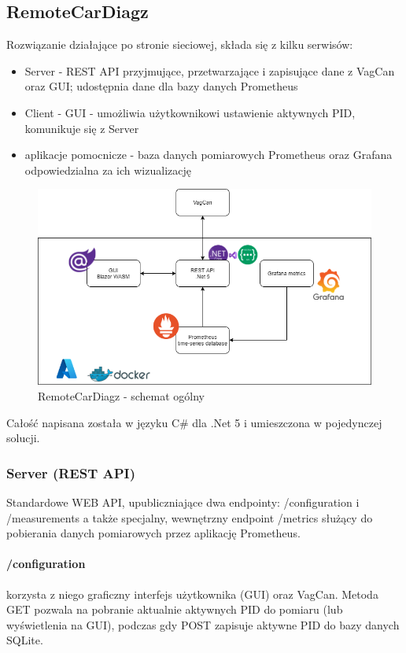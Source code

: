 \documentclass[10pt,a4paper]{article}
\begin{document}
		\subsection{RemoteCarDiagz}
		Rozwiązanie działające po stronie sieciowej, składa się z kilku serwisów:
		\begin{itemize}
			\item Server - REST API przyjmujące, przetwarzające i zapisujące dane z VagCan oraz GUI; udostępnia dane dla bazy danych Prometheus
			\item Client - GUI - umożliwia użytkownikowi ustawienie aktywnych PID, komunikuje się z Server
			\item aplikacje pomocnicze - baza danych pomiarowych Prometheus oraz Grafana odpowiedzialna za ich wizualizację
		\end{itemize}
		\begin{figure}[H]
			\centering
			\includegraphics[width=0.8\linewidth]{remoteCarDiagz_schema.drawio}
			\caption[RemoteCarDiagz- schemat ogólny]{RemoteCarDiagz - schemat ogólny}
			\label{fig:remotecardiagzschema}
		\end{figure}
		Całość napisana została w języku C\# dla .Net 5 i umieszczona w pojedynczej solucji. 
		\subsubsection{Server (REST API)}
		Standardowe WEB API, upubliczniające dwa endpointy: /configuration i /measurements a także specjalny, wewnętrzny endpoint /metrics służący do pobierania danych pomiarowych przez aplikację Prometheus.
		\paragraph{\slash configuration} korzysta z niego graficzny interfejs użytkownika (GUI) oraz VagCan. Metoda GET pozwala na pobranie aktualnie aktywnych PID do pomiaru (lub wyświetlenia na GUI), podczas gdy POST zapisuje aktywne PID do bazy danych SQLite.
\end{document}
